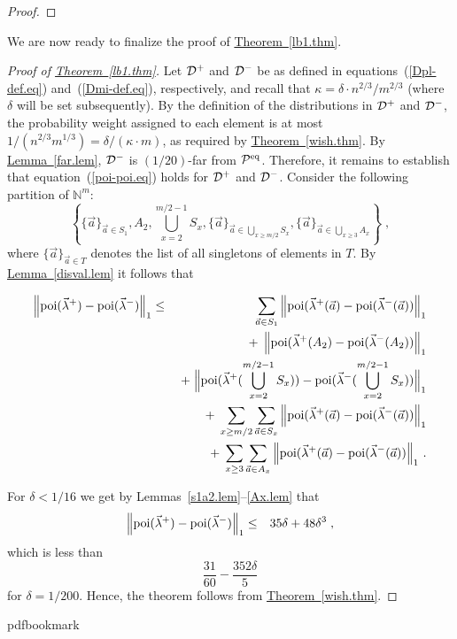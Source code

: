 \documentclass[10pt]{article}
\theoremstyle{definition}
\numberwithin{equation}{section}
\newcommand{\expref}[2]{\texorpdfstring{\hyperref[#2]{#1~\ref{#2}}}{#1~\ref{#2}}}
\newcommand{\poi}{{\rm poi}}
\newcommand{\calD}{{\cal D}}
\newcommand{\calPid}{{\cal P}^{\rm eq}}
\newcommand{\BEQ}{\begin{equation}} \newcommand{\EEQ}{\end{equation}}
\newcommand{\BEQN}{\begin{eqnarray}}\newcommand{\EEQN}{\end{eqnarray}}
\newcommand{\BPF}{\begin{proof}} \newcommand {\EPF}{\end{proof}}
\newcommand{\w}{\kappa}
\begin{document}
\BPF
\AxLemPrf
\EPF

%

\medskip\noindent
We are now ready to finalize the proof of \expref{Theorem}{lb1.thm}.

\begin{proof}[Proof of \expref{Theorem}{lb1.thm}]
Let $\calD^+$  and $\calD^-$
be as defined in equations~(\ref{Dpl-def.eq}) and~(\ref{Dmi-def.eq}), respectively,
and recall that $\w = \delta \cdot {n^{2/3}}/{m^{2/3}}$ (where $\delta$
will be set subsequently).
By the definition of the distributions in $\calD^+$ and $\calD^-$,
the probability weight assigned to each element is at most
${1}/{(n^{2/3}m^{1/3})} = {\delta}/{(\w\cdot m)}$, as required
by \expref{Theorem}{wish.thm}.
By \expref{Lemma}{far.lem}, $\calD^-$ is $(1/20)$-far from $\calPid$.
Therefore, it remains to establish
that equation~(\ref{poi-poi.eq}) holds for $\calD^+$ and $\calD^-$.
Consider the following partition of $\mathbb{N}^m$:
{\small
\BEQ
\left\{
\{\vec{a}\}_{\vec{a}\in S_1},
A_2,
 \bigcup_{x=2}^{m/2-1}S_x,
\{\vec{a}\}_{\vec{a}\in \bigcup_{x \geq m/2}S_x},
\{\vec{a}\}_{\vec{a}\in \bigcup_{x \geq 3}A_x}
\right\} \;,
\EEQ
}
where $\{\vec{a}\}_{\vec{a}\in T}$ denotes the list of all singletons of elements in $T$.
By \expref{Lemma}{disval.lem} it follows that
%

\BEQN
\left\|\poi(\vec{\lambda}^+) - \poi(\vec{\lambda}^-) \right\|_1
&\leq& \sum_{\vec{a}\in S_1}
  \left\|\poi(\vec{\lambda}^+(\vec{a})
     - \poi(\vec{\lambda}^-(\vec{a})) \right\|_1  \\
&&\;+\; \left\|\poi(\vec{\lambda}^+(A_2)
     - \poi(\vec{\lambda}^-(A_2)) \right\|_1  \\
&&\;+\; \Big\|\poi(\vec{\lambda}^+(\bigcup_{x=2}^{m/2-1}S_x)) -
     \poi(\vec{\lambda}^-(\bigcup_{x=2}^{m/2-1}S_x)) \Big\|_1 \\
     &&\;+\; \sum_{x\geq m/2} \sum_{\vec{a}\in S_x}
     \left\|\poi(\vec{\lambda}^+(\vec{a}) - \poi(\vec{\lambda}^-(\vec{a})) \right\|_1 \\
&&\;+\; \sum_{x\geq 3} \sum_{\vec{a}\in A_x}
     \left\|\poi(\vec{\lambda}^+(\vec{a}) - \poi(\vec{\lambda}^-(\vec{a})) \right\|_1\,.
\EEQN
















%
For $\delta < 1/16$ we get by
%
Lemmas~\ref{s1a2.lem}--\ref{Ax.lem} that
\BEQN
\left\|\poi(\vec{\lambda}^+) - \poi(\vec{\lambda}^-) \right\|_1 &\leq& 35\delta + 48\delta^3\;,
\EEQN
which is less than 
\[
\frac{31}{60} - \frac{352\delta}{5}
\]
for $\delta = 1/200$.
Hence, the theorem follows from \expref{Theorem}{wish.thm}.
\end{proof}
\clearpage
\begingroup\raggedright
%
%
%
%
%
\providecommand{\bibhead}[1]{}
%
\expandafter\ifx\csname pdfbookmark\endcsname\relax%
  \providecommand{\tocrefpdfbookmark}{}
\else\providecommand{\tocrefpdfbookmark}{%
   \hypertarget{tocreferences}{}%
   \pdfbookmark[1]{References}{tocreferences}}%
\fi
\end{document}
